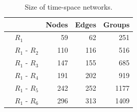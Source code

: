 \begin{table}
\begin{small}
\begin{center}
\begin{tabular}{ll|rrr}
&							&Nodes&Edges&Groups\\
\hline
\parbox[t]{2mm}{}
&        $R_1$ &  59 &  62 & 251\\
&$R_1$ - $R_2$ & 110 & 116 & 516\\
&$R_1$ - $R_3$ & 147 & 155 & 685\\
&$R_1$ - $R_4$ & 191 & 202 & 919\\
&$R_1$ - $R_5$ & 242 & 252 &1177\\
&$R_1$ - $R_6$ & 296 & 313 &1409
\end{tabular}
\caption{Size of time-space networks.}\label{tab:BigSize2}
\end{center}\end{small}
\end{table}

